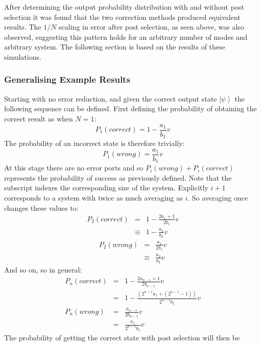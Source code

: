 \documentclass[aps,pra,twocolumn,superscriptaddress,numerical,floatfix]{revtex4-1}
\begin{document}
After determining the output probability distribution with and without post selection it was found that the two correction methods produced equivalent results. The $1/N$ scaling in error after post selection, as seen above, was also observed, suggesting this pattern holds for an arbitrary number of modes and arbitrary system. The following section is based on the results of these simulations.

\subsubsection{Generalising Example Results}

Starting with no error reduction, and given the correct output state $\left|\psi\right\rangle $ the following sequence can be defined. First defining the probability of obtaining the correct result as when $N=1$:
\begin{equation}
P_{1}(correct)=1-\frac{a_{1}}{b_{1}}v
\end{equation}
The probability of an incorrect state is therefore trivially:
\begin{equation}
P_{1}(wrong)=\frac{a_{1}}{b_{1}}v
\end{equation}
At this stage there are no error ports and so $P_{i}(wrong)+P_{i}(correct)$	represents the probability of success as previously defined. Note that the subscript indexes the corresponding size of the system. Explicitly $i+1$ corresponds to a system with twice as much averaging as $i$.
So averaging once changes these values to:
\begin{eqnarray}
P_{2}(correct) & = & 1-\frac{2a_{1}+1}{2b_{1}}v\nonumber \\
& \equiv & 1-\frac{a_{2}}{b_{2}}v
\end{eqnarray}
\begin{eqnarray}
P_{2}(wrong) & = & \frac{a_{1}}{2b_{1}}v\nonumber \\
& \equiv & \frac{a_{2}}{b_{2}}v
\end{eqnarray}
And so on, so in general:
\begin{eqnarray}
P_{n}(correct) & = & 1-\frac{2a_{n-1}+1}{2b_{n-1}}v\nonumber \\
& = & 1-\frac{\left(2^{n-1}a_{1}+\left(2^{n-1}-1\right)\right)}{2^{n-1}b_{1}}v\\
P_{n}(wrong) & = & \frac{a_{n-1}}{2b_{n-1}}v\nonumber \\
& = & \frac{a_{1}}{2^{n-1}b_{1}}v
\end{eqnarray}
The probability of getting the correct state with post selection will then be
\end{document}
